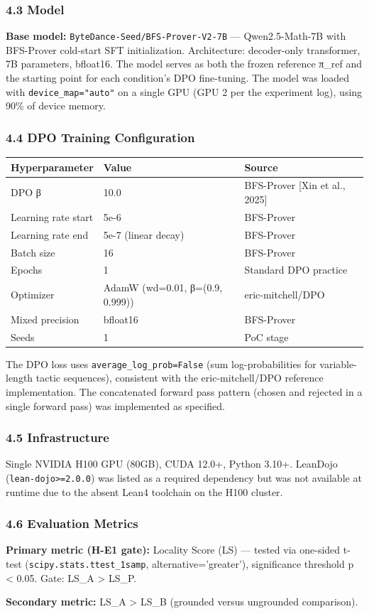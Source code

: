 \subsubsection{4.3 Model}

\textbf{Base model:} \texttt{ByteDance-Seed/BFS-Prover-V2-7B} — Qwen2.5-Math-7B with BFS-Prover cold-start SFT initialization. Architecture: decoder-only transformer, 7B parameters, bfloat16. The model serves as both the frozen reference π_ref and the starting point for each condition's DPO fine-tuning. The model was loaded with \texttt{device_map="auto"} on a single GPU (GPU 2 per the experiment log), using 90\% of device memory.

\subsubsection{4.4 DPO Training Configuration}

\begin{table}[htbp]
\centering
\begin{tabular}{lll}
\toprule
Hyperparameter & Value & Source \\
\midrule
DPO β & 10.0 & BFS-Prover [Xin et al., 2025] \\
Learning rate start & 5e-6 & BFS-Prover \\
Learning rate end & 5e-7 (linear decay) & BFS-Prover \\
Batch size & 16 & BFS-Prover \\
Epochs & 1 & Standard DPO practice \\
Optimizer & AdamW (wd=0.01, β=(0.9, 0.999)) & eric-mitchell/DPO \\
Mixed precision & bfloat16 & BFS-Prover \\
Seeds & 1 & PoC stage \\
\bottomrule
\end{tabular}
\end{table}

The DPO loss uses \texttt{average_log_prob=False} (sum log-probabilities for variable-length tactic sequences), consistent with the eric-mitchell/DPO reference implementation. The concatenated forward pass pattern (chosen and rejected in a single forward pass) was implemented as specified.

\subsubsection{4.5 Infrastructure}

Single NVIDIA H100 GPU (80GB), CUDA 12.0+, Python 3.10+. LeanDojo (\texttt{lean-dojo>=2.0.0}) was listed as a required dependency but was not available at runtime due to the absent Lean4 toolchain on the H100 cluster.

\subsubsection{4.6 Evaluation Metrics}

\textbf{Primary metric (H-E1 gate):} Locality Score (LS) — tested via one-sided t-test (\texttt{scipy.stats.ttest_1samp}, alternative='greater'), significance threshold p < 0.05. Gate: LS_A > LS_P.

\textbf{Secondary metric:} LS_A > LS_B (grounded versus ungrounded comparison).
